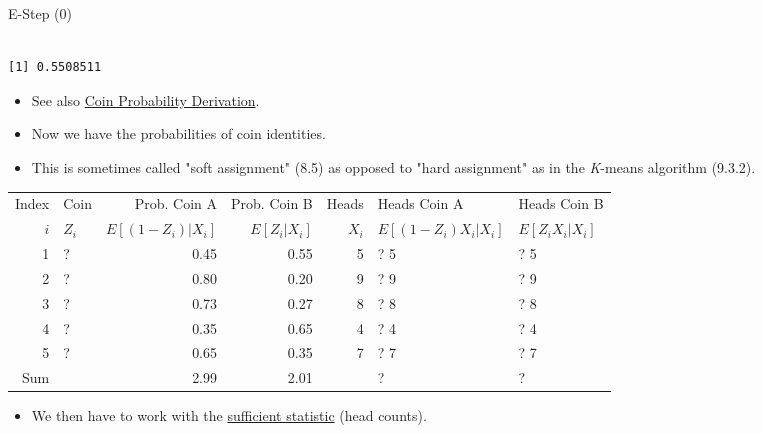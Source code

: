 \documentclass[dvipdfmx,bigger,aspectratio=169]{beamer}
\begin{document}
\begin{frame}[fragile,allowframebreaks,label=,t]{E-Step (0)}
\begin{verbatim}

[1] 0.5508511
\end{verbatim}


\normalsize
\begin{itemize}
\item See also \hyperlink{sec:org55b749f}{Coin Probability Derivation}.
\end{itemize}

\newpage
\begin{itemize}
\item Now we have the probabilities of coin identities.
\item This is sometimes called "soft assignment" \cite{hastieElementsStatisticalLearning2016} (8.5) as opposed to "hard assignment" as in the \emph{K}-means algorithm \cite{bishopPatternRecognitionMachine2006} (9.3.2).
\end{itemize}
\footnotesize
\begin{center}
\begin{tabular}{r|l|rr|r|ll|}
Index & Coin & Prob. Coin A & Prob. Coin B & Heads & Heads Coin A & Heads Coin B\\
\(i\) & \(Z_{i}\) & \(E[(1-Z_{i})\vert X_{i}]\) & \(E[Z_{i}\vert X_{i}]\) & \(X_{i}\) & \(E[(1-Z_{i}) X_{i} \vert X_{i}]\) & \(E[Z_{i} X_{i} \vert X_{i}]\)\\
\hline
1 & ? & 0.45 & 0.55 & 5 & ? \texttimes{} 5 & ? \texttimes{} 5\\
2 & ? & 0.80 & 0.20 & 9 & ? \texttimes{} 9 & ? \texttimes{} 9\\
3 & ? & 0.73 & 0.27 & 8 & ? \texttimes{} 8 & ? \texttimes{} 8\\
4 & ? & 0.35 & 0.65 & 4 & ? \texttimes{} 4 & ? \texttimes{} 4\\
5 & ? & 0.65 & 0.35 & 7 & ? \texttimes{} 7 & ? \texttimes{} 7\\
\hline
Sum &  & 2.99 & 2.01 &  & ? & ?\\
\end{tabular}
\end{center}
\normalsize
\begin{itemize}
\item We then have to work with the \href{https://www.statisticshowto.datasciencecentral.com/sufficient-statistic/}{sufficient statistic} (head counts).
\end{itemize}


\end{frame}
\end{document}
